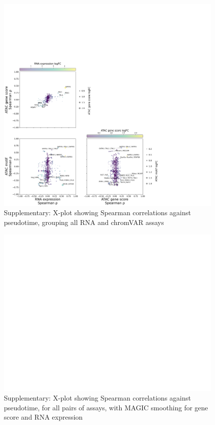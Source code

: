 \documentclass[a4paper]{article}
\begin{document}
\begin{figure}[!htb]
  \centering
  \includegraphics[width=\textwidth]{../figures/hematopoiesis/MKP_40_110_smooth_none_grouped_X_plot.png}
  \caption{Supplementary: X-plot showing Spearman correlations against pseudotime, grouping all RNA and chromVAR assays}
\end{figure}


\begin{figure}[!htb]
  \centering
  \includegraphics[width=\textwidth]{../figures/hematopoiesis/MKP_40_110_smooth_magic_detailed_X_plot.png}
  \caption{Supplementary: X-plot showing Spearman correlations against pseudotime, for all pairs of assays, with MAGIC smoothing for gene score and RNA expression}
\end{figure}
\end{document}
